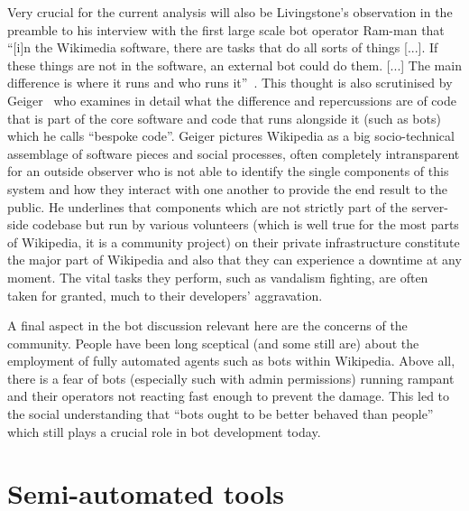 Very crucial for the current analysis will also be Livingstone's observation in the preamble to his interview with the first large scale bot operator Ram-man that
``[i]n the Wikimedia software, there are tasks that do all sorts of things [...].
If these things are not in the software, an external bot could do them. [...]
The main difference is where it runs and who runs it''~\cite{Livingstone2016}.
This thought is also scrutinised by Geiger~\cite{Geiger2014} who examines in detail what the difference and repercussions are of code that is part of the core software and code that runs alongside it (such as bots) which he calls ``bespoke code''.
Geiger pictures Wikipedia as a big socio-technical assemblage of software pieces and social processes, often completely intransparent for an outside observer who is not able to identify the single components of this system and how they interact with one another to provide the end result to the public.
He underlines that components which are not strictly part of the server-side codebase but run by various volunteers (which is well true for the most parts of Wikipedia, it is a community project) on their private infrastructure constitute the major part of Wikipedia and also that they can experience a downtime at any moment.
The vital tasks they perform, such as vandalism fighting, are often taken for granted, much to their developers' aggravation.

A final aspect in the bot discussion relevant here are the concerns of the community.
People have been long sceptical (and some still are) about the employment of fully automated agents such as bots within Wikipedia.
Above all, there is a fear of bots (especially such with admin permissions) running rampant and their operators not reacting fast enough to prevent the damage.
This led to the social understanding that ``bots ought to be better behaved than people''~\cite{Geiger2011} which still plays a crucial role in bot development today.


\section{Semi-automated tools}


